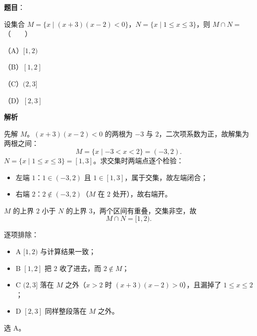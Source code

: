 \begin{answer}

\textbf{题目}：

设集合 $M=\{x\mid (x+3)(x-2)<0\}$，$N=\{x\mid 1\leqslant x\leqslant 3\}$，则 $M\cap N=$\mbox{（　　）}

（A）$[1,2)$

（B）$[1,2]$

（C）$(2,3]$

（D）$[2,3]$

\textbf{解析}

先解 $M$。$(x+3)(x-2)<0$ 的两根为 $-3$ 与 $2$，二次项系数为正，故解集为两根之间：
\nopagebreak[4]
\[
M=\{x\mid -3<x<2\}=(-3,2).
\]
$N=\{x\mid 1\leqslant x\leqslant 3\}=[1,3]$。求交集时两端点逐个检验：

\begin{itemize}
\item 左端 $1$：$1\in(-3,2)$ 且 $1\in[1,3]$，属于交集，故左端闭合；
\item 右端 $2$：$2\notin(-3,2)$（$M$ 在 $2$ 处开），故右端开。
\end{itemize}

$M$ 的上界 $2$ 小于 $N$ 的上界 $3$，两个区间有重叠，交集非空，故
\nopagebreak[4]
\[
M\cap N=[1,2).
\]

逐项排除：

\begin{itemize}
\item A $[1,2)$ 与计算结果一致；
\item B $[1,2]$ 把 $2$ 收了进去，而 $2\notin M$；
\item C $(2,3]$ 落在 $M$ 之外（$x>2$ 时 $(x+3)(x-2)>0$），且漏掉了 $1\leqslant x\leqslant2$；
\item D $[2,3]$ 同样整段落在 $M$ 之外。
\end{itemize}

选 A。


\end{answer}

